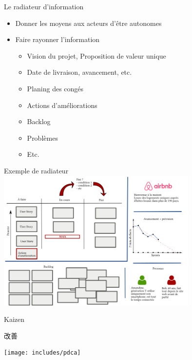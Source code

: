 \documentclass{beamer}
\begin{document}
\begin{frame}{Le radiateur d'information}
  \begin{itemize}
    \item Donner les moyens aux acteurs d'être autonomes
    \item Faire rayonner l'information
    
    \begin{itemize}
      \item Vision du projet, Proposition de valeur unique
      \item Date de livraison, avancement, etc.
      \item Planing des congés
      \item Actions d'améliorations
      \item Backlog
      \item Problèmes
      \item Etc.
    \end{itemize}
  \end{itemize}
\end{frame}

\begin{frame}{Exemple de radiateur}
  \center
  \includegraphics[width=10cm]{includes/radiateur}
\end{frame}

\begin{frame}{Kaizen 
    {\begin{CJK*}{UTF8}{mj} 改善 \end{CJK*}}
  }
  \center
  \texttt{[image: includes/pdca]}
\end{frame}
\end{document}

